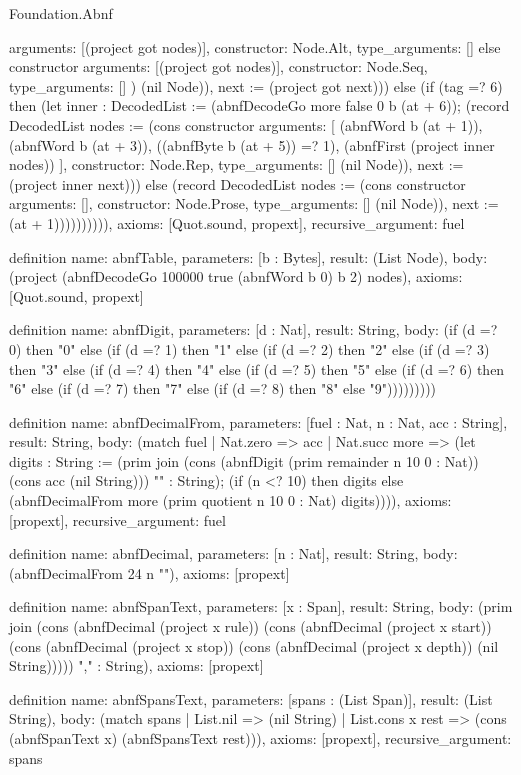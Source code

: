 \begin{lexlean}{Foundation.Abnf}
\begin{semanticmodule}
{{{      arguments: [(project got nodes)],
      constructor: Node.Alt,
      type_arguments: []
    } else constructor{
      arguments: [(project got nodes)],
      constructor: Node.Seq,
      type_arguments: []
    }) (nil Node)), next := (project got next)})) else (if (tag =? 6) then (let inner : DecodedList := (abnfDecodeGo more false 0 b (at + 6)); (record DecodedList {nodes := (cons constructor{
      arguments: [
        (abnfWord b (at + 1)),
        (abnfWord b (at + 3)),
        ((abnfByte b (at + 5)) =? 1),
        (abnfFirst (project inner nodes))
      ],
      constructor: Node.Rep,
      type_arguments: []
    } (nil Node)), next := (project inner next)})) else (record DecodedList {nodes := (cons constructor{
      arguments: [],
      constructor: Node.Prose,
      type_arguments: []
    } (nil Node)), next := (at + 1)}))))))))),
  axioms: [Quot.sound, propext],
  recursive_argument: fuel
}

definition{
  name: abnfTable,
  parameters: [b : Bytes],
  result: (List Node),
  body: (project (abnfDecodeGo 100000 true (abnfWord b 0) b 2) nodes),
  axioms: [Quot.sound, propext]
}

definition{
  name: abnfDigit,
  parameters: [d : Nat],
  result: String,
  body: (if (d =? 0) then "0" else (if (d =? 1) then "1" else (if (d =? 2) then "2" else (if (d =? 3) then "3" else (if (d =? 4) then "4" else (if (d =? 5) then "5" else (if (d =? 6) then "6" else (if (d =? 7) then "7" else (if (d =? 8) then "8" else "9")))))))))
}

definition{
  name: abnfDecimalFrom,
  parameters: [fuel : Nat, n : Nat, acc : String],
  result: String,
  body: (match fuel
    | Nat.zero => acc
    | Nat.succ more => (let digits : String := (prim join (cons (abnfDigit (prim remainder n 10 0 : Nat)) (cons acc (nil String))) "" : String); (if (n <? 10) then digits else (abnfDecimalFrom more (prim quotient n 10 0 : Nat) digits)))),
  axioms: [propext],
  recursive_argument: fuel
}

definition{
  name: abnfDecimal,
  parameters: [n : Nat],
  result: String,
  body: (abnfDecimalFrom 24 n ""),
  axioms: [propext]
}

definition{
  name: abnfSpanText,
  parameters: [x : Span],
  result: String,
  body: (prim join (cons (abnfDecimal (project x rule)) (cons (abnfDecimal (project x start)) (cons (abnfDecimal (project x stop)) (cons (abnfDecimal (project x depth)) (nil String))))) "," : String),
  axioms: [propext]
}

definition{
  name: abnfSpansText,
  parameters: [spans : (List Span)],
  result: (List String),
  body: (match spans
    | List.nil => (nil String)
    | List.cons x rest => (cons (abnfSpanText x) (abnfSpansText rest))),
  axioms: [propext],
  recursive_argument: spans
}


\end{semanticmodule}
\end{lexlean}
